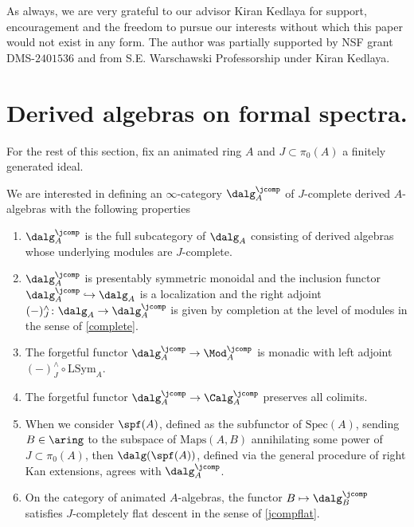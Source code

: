 \documentclass[10pt,reqno]{amsart}
\numberwithin{equation}{section}
\newcommand{\spec}{{\mathrm{Spec}}}
\newcommand{\Maps}{\mathrm{Maps}}
\newcommand{\Sym}{\mathrm{Sym}}
\renewcommand{\L}{\mathrm{L}}
\newcommand{\into}{\hookrightarrow}
\begin{document}
As always, we are very grateful to our advisor Kiran Kedlaya for support, encouragement and the freedom to pursue our interests without which this paper would not exist in any form. The author was partially supported by NSF grant DMS-$2401536$
and from S.E. Warschawski Professorship under Kiran Kedlaya.


\section{Derived algebras on formal spectra.}\label{sec: jcomp setting}

\begin{notation}\label{notation: jcomp}
    For the rest of this section, fix an animated ring $A$ and $J\subset \pi_0(A)$ a finitely generated ideal.
\end{notation}
\begin{goal} \label{goal: purpose of dalgj}
 We are interested in defining an $\infty$-category $\dalg_A^\jcomp$ of $J$-complete derived $A$-algebras with the following properties


    \begin{enumerate}
\item $\dalg_A^\jcomp$ is the full subcategory of $\dalg_A$ consisting of derived algebras whose underlying modules are $J$-complete. 
    \item $\dalg_A^\jcomp$ is presentably symmetric monoidal and the inclusion functor $\dalg_A^\jcomp\into \dalg_A$ is a localization and the right adjoint $(-)^\wedge_J\colon \dalg_A\to \dalg_A^\jcomp$ is given by completion at the level of modules in the sense of \ref{complete}.
    \item The forgetful functor $\dalg_A^\jcomp\to \Mod_A^\jcomp$ is monadic with left adjoint $(-)^\wedge_{J}\circ \L\Sym_A$. 
    \item The forgetful functor $\dalg_A^\jcomp\to \Calg_A^\jcomp$ preserves all colimits.
    \item When we consider $\spf(A)$, defined as the subfunctor of $\spec(A)$, sending $B\in \aring$ to the subspace of $\Maps(A,B)$ annihilating some power of $J\subset \pi_0(A)$, then $\dalg(\spf(A))$, defined via the general procedure of right Kan extensions, agrees with $\dalg_A^\jcomp$.
    \item On the category of animated $A$-algebras, the functor $B\mapsto \dalg_B^\jcomp$ satisfies $J$-completely flat descent in the sense of \ref{jcompflat}.
\end{enumerate}
\end{goal}
\end{document}
